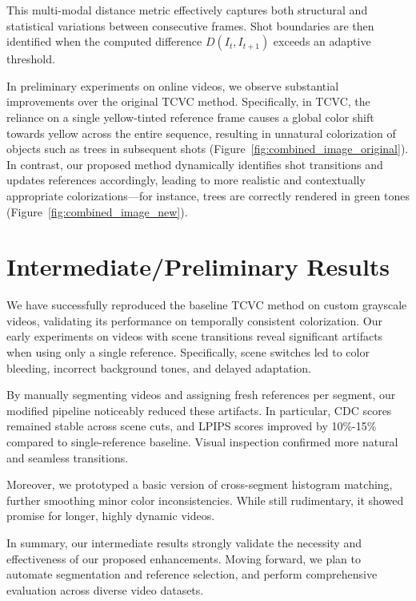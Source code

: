 \documentclass[10pt,twocolumn,letterpaper]{article}
\begin{document}
This multi-modal distance metric effectively captures both structural and statistical variations between consecutive frames. Shot boundaries are then identified when the computed difference $D(I_t, I_{t+1})$ exceeds an adaptive threshold.

In preliminary experiments on online videos, we observe substantial improvements over the original TCVC method. Specifically, in TCVC, the reliance on a single yellow-tinted reference frame causes a global color shift towards yellow across the entire sequence, resulting in unnatural colorization of objects such as trees in subsequent shots (Figure~\ref{fig:combined_image_original}). In contrast, our proposed method dynamically identifies shot transitions and updates references accordingly, leading to more realistic and contextually appropriate colorizations—for instance, trees are correctly rendered in green tones (Figure~\ref{fig:combined_image_new}).





\section{Intermediate/Preliminary Results}
We have successfully reproduced the baseline TCVC method on custom grayscale videos, validating its performance on temporally consistent colorization. Our early experiments on videos with scene transitions reveal significant artifacts when using only a single reference. Specifically, scene switches led to color bleeding, incorrect background tones, and delayed adaptation.

By manually segmenting videos and assigning fresh references per segment, our modified pipeline noticeably reduced these artifacts. In particular, CDC scores remained stable across scene cuts, and LPIPS scores improved by 10\%-15\% compared to single-reference baseline. Visual inspection confirmed more natural and seamless transitions.

Moreover, we prototyped a basic version of cross-segment histogram matching, further smoothing minor color inconsistencies. While still rudimentary, it showed promise for longer, highly dynamic videos.

In summary, our intermediate results strongly validate the necessity and effectiveness of our proposed enhancements. Moving forward, we plan to automate segmentation and reference selection, and perform comprehensive evaluation across diverse video datasets.
\end{document}
